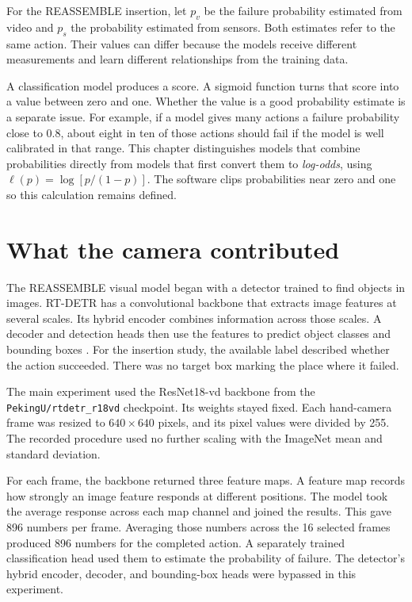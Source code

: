 For the REASSEMBLE insertion, let \(p_v\) be the failure probability estimated from video and \(p_s\) the probability estimated from sensors. Both estimates refer to the same action. Their values can differ because the models receive different measurements and learn different relationships from the training data.

A classification model produces a score. A sigmoid function turns that score into a value between zero and one. Whether the value is a good probability estimate is a separate issue. For example, if a model gives many actions a failure probability close to 0.8, about eight in ten of those actions should fail if the model is well calibrated in that range. This chapter distinguishes models that combine probabilities directly from models that first convert them to \textit{log-odds}, using \(\ell(p)=\log[p/(1-p)]\). The software clips probabilities near zero and one so this calculation remains defined.

\section{What the camera contributed}

The REASSEMBLE visual model began with a detector trained to find objects in images. RT-DETR has a convolutional backbone that extracts image features at several scales. Its hybrid encoder combines information across those scales. A decoder and detection heads then use the features to predict object classes and bounding boxes \parencite{Zhao2024RTDETR}. For the insertion study, the available label described whether the action succeeded. There was no target box marking the place where it failed.

The main experiment used the ResNet18-vd backbone from the \texttt{PekingU/rtdetr\_r18vd} checkpoint. Its weights stayed fixed. Each hand-camera frame was resized to \(640 \times 640\) pixels, and its pixel values were divided by 255. The recorded procedure used no further scaling with the ImageNet mean and standard deviation.

For each frame, the backbone returned three feature maps. A feature map records how strongly an image feature responds at different positions. The model took the average response across each map channel and joined the results. This gave 896 numbers per frame. Averaging those numbers across the 16 selected frames produced 896 numbers for the completed action. A separately trained classification head used them to estimate the probability of failure. The detector’s hybrid encoder, decoder, and bounding-box heads were bypassed in this experiment.

